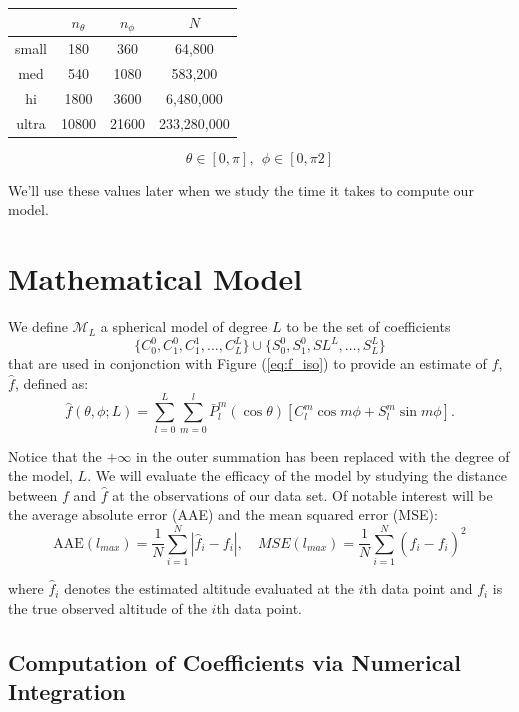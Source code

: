 \documentclass[a4paper]{article}
\theoremstyle{definition}
\begin{document}
    \begin{center}
    \begin{tabular}{ c |  c  c  c }
        & $n_\theta$ & $n_\phi$ & $N$ \\ 
    \hline
    small & 180 & 360 & 64,800\\
    med & 540 & 1080 & 583,200\\
    hi & 1800 & 3600 & 6,480,000\\
    ultra & 10800 & 21600 & 233,280,000
    \end{tabular}
    \end{center}
$$\theta \in [0, \pi],\ \ \phi \in [0, \pi2]$$

We'll use these values later when we study the time it takes to compute our model.

\section{Mathematical Model}

We define $\mathcal{M}_L$ a spherical model of degree $L$ to be the set of coefficients $$\{C_0^0, C_1^0, C_1^1, \dots, C_L^L\} \cup \{S_0^0, S_1^0, SL^L, \dots, S_L^L\}$$
 that are used in conjonction with Figure (\ref{eq:f_iso}) to provide an estimate of $f$, $\hat f$, defined as:
\begin{equation}
    \hat f(\theta, \phi; L) = \sum_{l = 0}^{L}\sum_{m = 0}^l \bar P_l^m(\cos\theta)[C_l^m\cos m\phi + S_l^m \sin m \phi].
\end{equation}

Notice that the $+\infty$ in the outer summation has been replaced with the degree of the model, $L$. We will evaluate the efficacy of the model by studying the distance between $f$ and $\hat f$
at the observations of our data set. Of notable interest will be the average absolute error (AAE) and the mean squared error (MSE):
\begin{equation}
    \label{eq:AAE}
    \mathrm{AAE}(l_{max}) = \frac{1}{N}\sum_{i = 1}^{N} |\hat f_i - f_i |, \quad MSE(l_{max}) = \frac{1}{N} \sum_{i = 1}^N (\hat f_i - f_i)^2
\end{equation}

where $\hat f_i$ denotes the estimated altitude evaluated at the $i$th data point and $f_i$ is the true observed altitude of the $i$th data point.


\subsection{Computation of Coefficients via Numerical Integration}
\end{document}
